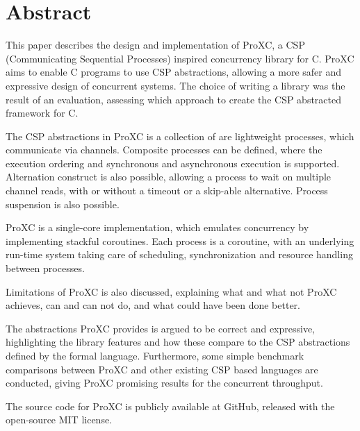 
\newpage
{}
\section*{Abstract}

This paper describes the design and implementation of ProXC, a CSP (Communicating Sequential Processes) inspired concurrency library for C. ProXC aims to enable C programs to use CSP abstractions, allowing a more safer and expressive design of concurrent systems. The choice of writing a library was the result of an evaluation, assessing which approach to create the CSP abstracted framework for C. 

The CSP abstractions in ProXC is a collection of are lightweight processes, which communicate via channels. Composite processes can be defined, where the execution ordering and synchronous and asynchronous execution is supported. Alternation construct is also possible, allowing a process to wait on multiple channel reads, with or without a timeout or a skip-able alternative. Process suspension is also possible. 

ProXC is a single\hyp{}core implementation, which emulates concurrency by implementing stackful coroutines. Each process is a coroutine, with an underlying run\hyp{}time system taking care of scheduling, synchronization and resource handling between processes. 

Limitations of ProXC is also discussed, explaining what and what not ProXC achieves, can and can not do, and what could have been done better.

The abstractions ProXC provides is argued to be correct and expressive, highlighting the library features and how these compare to the CSP abstractions defined by the formal language. Furthermore, some simple benchmark comparisons between ProXC and other existing CSP based languages are conducted, giving ProXC promising results for the concurrent throughput. 

The source code for ProXC is publicly available at GitHub, released with the open\hyp{}source MIT license. 


\vfill